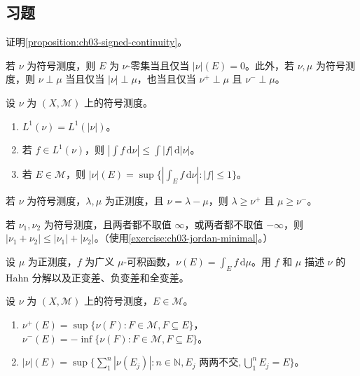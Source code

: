 \documentclass[../../main.tex]{subfiles}%
\begin{document}
\subsection*{习题}
\begin{exercise}\label{exercise:ch03-signed-continuity-proof}
证明\cref{proposition:ch03-signed-continuity}。
\end{exercise}
\begin{exercise}\label{exercise:ch03-variation-null-singular}
若 $\nu$ 为符号测度，则 $E$ 为 $\nu$-零集当且仅当 $|\nu|(E)=0$。此外，若 $\nu,\mu$ 为符号测度，则 $\nu\perp\mu$ 当且仅当 $|\nu|\perp\mu$，也当且仅当 $\nu^+\perp\mu$ 且 $\nu^-\perp\mu$。
\end{exercise}
\begin{exercise}\label{exercise:ch03-variation-integral}
设 $\nu$ 为 $(X,\mathscr{M})$ 上的符号测度。
\begin{enumerate}
\item $L^1(\nu)=L^1(|\nu|)$。
\item 若 $f\in L^1(\nu)$，则 $|\int f\,\mathrm{d}\nu|\le\int|f|\,\mathrm{d}|\nu|$。
\item 若 $E\in\mathscr{M}$，则 $|\nu|(E)=\sup\{|\int_E f\,\mathrm{d}\nu|:|f|\le1\}$。
\end{enumerate}
\end{exercise}
\begin{exercise}\label{exercise:ch03-jordan-minimal}
若 $\nu$ 为符号测度，$\lambda,\mu$ 为正测度，且 $\nu=\lambda-\mu$，则 $\lambda\ge\nu^+$ 且 $\mu\ge\nu^-$。
\end{exercise}
\begin{exercise}\label{exercise:ch03-variation-triangle}
若 $\nu_1,\nu_2$ 为符号测度，且两者都不取值 $\infty$，或两者都不取值 $-\infty$，则 $|\nu_1+\nu_2|\le|\nu_1|+|\nu_2|$。（使用\cref{exercise:ch03-jordan-minimal}。）
\end{exercise}
\begin{exercise}\label{exercise:ch03-density-variations}
设 $\mu$ 为正测度，$f$ 为广义 $\mu$-可积函数，$\nu(E)=\int_E f\,\mathrm{d}\mu$。用 $f$ 和 $\mu$ 描述 $\nu$ 的 Hahn 分解以及正变差、负变差和全变差。
\end{exercise}
\begin{exercise}\label{exercise:ch03-variation-set-suprema}
设 $\nu$ 为 $(X,\mathscr{M})$ 上的符号测度，$E\in\mathscr{M}$。
\begin{enumerate}
\item $\nu^+(E)=\sup\{\nu(F):F\in\mathscr{M},F\subseteq E\}$，$\nu^-(E)=-\inf\{\nu(F):F\in\mathscr{M},F\subseteq E\}$。
\item $|\nu|(E)=\sup\{\sum_1^n|\nu(E_j)|:n\in\mathbb{N},E_j\text{ 两两不交},\bigcup_1^nE_j=E\}$。
\end{enumerate}
\end{exercise}
\end{document}
